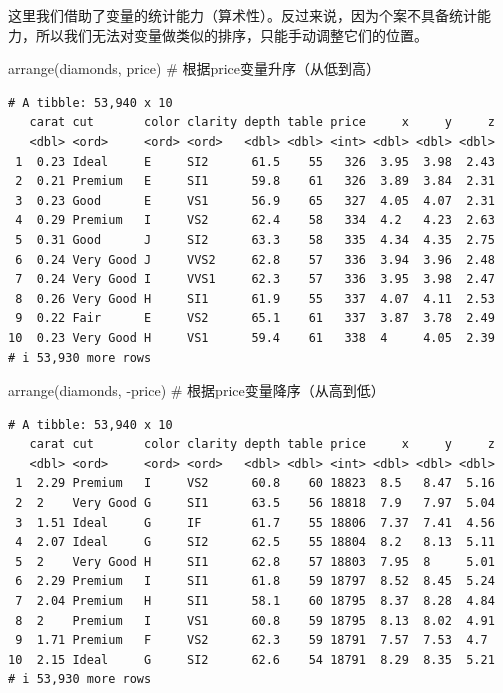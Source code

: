 \documentclass[
  letterpaper,
]{ctexbook}
\newenvironment{Shaded}{\begin{snugshade}}{\end{snugshade}}
\newcommand{\CommentTok}[1]{\textcolor[rgb]{0.37,0.37,0.37}{#1}}
\newcommand{\FunctionTok}[1]{\textcolor[rgb]{0.28,0.35,0.67}{#1}}
\newcommand{\NormalTok}[1]{\textcolor[rgb]{0.00,0.23,0.31}{#1}}
\newcommand{\SpecialCharTok}[1]{\textcolor[rgb]{0.37,0.37,0.37}{#1}}
\begin{document}
这里我们借助了变量的统计能力（算术性）。反过来说，因为个案不具备统计能力，所以我们无法对变量做类似的排序，只能手动调整它们的位置。

\begin{Shaded}
\begin{Highlighting}[]
\FunctionTok{arrange}\NormalTok{(diamonds, price) }\CommentTok{\# 根据price变量升序（从低到高）}
\end{Highlighting}
\end{Shaded}

\begin{verbatim}
# A tibble: 53,940 x 10
   carat cut       color clarity depth table price     x     y     z
   <dbl> <ord>     <ord> <ord>   <dbl> <dbl> <int> <dbl> <dbl> <dbl>
 1  0.23 Ideal     E     SI2      61.5    55   326  3.95  3.98  2.43
 2  0.21 Premium   E     SI1      59.8    61   326  3.89  3.84  2.31
 3  0.23 Good      E     VS1      56.9    65   327  4.05  4.07  2.31
 4  0.29 Premium   I     VS2      62.4    58   334  4.2   4.23  2.63
 5  0.31 Good      J     SI2      63.3    58   335  4.34  4.35  2.75
 6  0.24 Very Good J     VVS2     62.8    57   336  3.94  3.96  2.48
 7  0.24 Very Good I     VVS1     62.3    57   336  3.95  3.98  2.47
 8  0.26 Very Good H     SI1      61.9    55   337  4.07  4.11  2.53
 9  0.22 Fair      E     VS2      65.1    61   337  3.87  3.78  2.49
10  0.23 Very Good H     VS1      59.4    61   338  4     4.05  2.39
# i 53,930 more rows
\end{verbatim}

\begin{Shaded}
\begin{Highlighting}[]
\FunctionTok{arrange}\NormalTok{(diamonds, }\SpecialCharTok{{-}}\NormalTok{price) }\CommentTok{\# 根据price变量降序（从高到低）}
\end{Highlighting}
\end{Shaded}

\begin{verbatim}
# A tibble: 53,940 x 10
   carat cut       color clarity depth table price     x     y     z
   <dbl> <ord>     <ord> <ord>   <dbl> <dbl> <int> <dbl> <dbl> <dbl>
 1  2.29 Premium   I     VS2      60.8    60 18823  8.5   8.47  5.16
 2  2    Very Good G     SI1      63.5    56 18818  7.9   7.97  5.04
 3  1.51 Ideal     G     IF       61.7    55 18806  7.37  7.41  4.56
 4  2.07 Ideal     G     SI2      62.5    55 18804  8.2   8.13  5.11
 5  2    Very Good H     SI1      62.8    57 18803  7.95  8     5.01
 6  2.29 Premium   I     SI1      61.8    59 18797  8.52  8.45  5.24
 7  2.04 Premium   H     SI1      58.1    60 18795  8.37  8.28  4.84
 8  2    Premium   I     VS1      60.8    59 18795  8.13  8.02  4.91
 9  1.71 Premium   F     VS2      62.3    59 18791  7.57  7.53  4.7 
10  2.15 Ideal     G     SI2      62.6    54 18791  8.29  8.35  5.21
# i 53,930 more rows
\end{verbatim}
\end{document}
